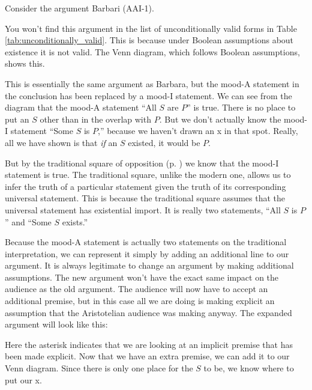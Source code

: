 Consider the argument Barbari (AAI-1).

\begin{kormanize}
\end{kormanize}

You won't find this argument in the list of unconditionally valid forms in Table \ref{tab:unconditionally_valid}. This is because under Boolean assumptions about existence it is not valid. The Venn diagram, which follows Boolean assumptions, shows this.


This is essentially the same argument as Barbara, but the mood-A statement in the conclusion has been replaced by a mood-I statement. We can see from the diagram that the mood-A statement ``All $S$ are $P$'' is true. There is no place to put an $S$ other than in the overlap with $P$. But we don't actually know the mood-I statement ``Some $S$ is $P$,'' because we haven't drawn an x in that spot. Really, all we have shown is that \emph{if} an $S$ existed, it would be $P$.

But by the traditional square of opposition (p. \pageref{fig:traditionalsquare}) we know that the mood-I statement is true. The traditional square, unlike the modern one, allows us to infer the truth of a particular statement given the truth of its corresponding universal statement. This is because the traditional square assumes that the universal statement has existential import. It is really two statements, ``All $S$ is $P$'' and ``Some $S$ exists.''

Because the mood-A statement is actually two statements on the traditional interpretation, we can represent it simply by adding an additional line to our argument. It is always legitimate to change an argument by making additional assumptions. The new argument won't have the exact same impact on the audience as the old argument. The audience will now have to accept an additional premise, but in this case all we are doing is making explicit an assumption that the Aristotelian audience was making anyway. The expanded argument will look like this:

\begin{kormanize}
\end{kormanize}

Here the asterisk indicates that we are looking at an implicit premise that has been made explicit. Now that we have an extra premise, we can add it to our Venn diagram. Since there is only one place for the $S$ to be, we know where to put our x.


